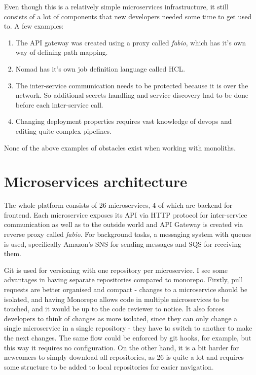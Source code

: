 Even though this is a relatively simple microservices infrastructure, it still consists of a lot of components that new developers needed some time to get used to. A few examples:
\begin{enumerate}
    \item The API gateway was created using a proxy called \textit{fabio}, which has it's own way of defining path mapping.
    \item Nomad has it's own job definition language called HCL.
    \item The inter-service communication needs to be protected because it is over the network. So additional secrets handling and service discovery had to be done before each inter-service call.
    \item Changing deployment properties requires vast knowledge of devops and editing quite complex pipelines.
\end{enumerate}
None of the above examples of obstacles exist when working with monoliths.



\section{Microservices architecture}
The whole platform consists of 26 microservices, 4 of which are backend for frontend. Each microservice exposes its API via HTTP protocol for inter-service communication as well as to the outside world and API Gateway is created via reverse proxy called \textit{fabio}. For background tasks, a messaging system with queues is used, specifically Amazon's SNS for sending messages and SQS for receiving them.

Git is used for versioning with one repository per microservice. I see some advantages in having separate repositories compared to monorepo. Firstly, pull requests are better organised and compact - changes to a microservice should be isolated, and having Monorepo allows code in multiple microservices to be touched, and it would be up to the code reviewer to notice. It also forces developers to think of changes as more isolated, since they can only change a single microservice in a single repository - they have to switch to another to make the next changes. The same flow could be enforced by git hooks, for example, but this way it requires no configuration. On the other hand, it is a bit harder for newcomers to simply download all repositories, as 26 is quite a lot and requires some structure to be added to local repositories for easier navigation.

